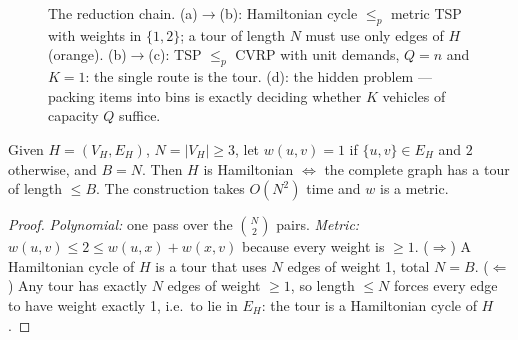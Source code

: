 \begin{figure}[t]
\caption{The reduction chain. (a)$\to$(b): Hamiltonian cycle $\le_p$ metric TSP with weights in $\{1,2\}$;
a tour of length $N$ must use only edges of $H$ (orange). (b)$\to$(c): TSP $\le_p$ CVRP with unit
demands, $Q=n$ and $K=1$: the single route is the tour. (d): the hidden problem --- packing items into
bins is exactly deciding whether $K$ vehicles of capacity $Q$ suffice.}
\label{fig:reductions}
\end{figure}

\begin{theorem}[\hc{} $\le_p$ \tsp-D]\label{thm:hc}
Given $H=(V_H,E_H)$, $N=|V_H|\ge 3$, let $w(u,v)=1$ if $\{u,v\}\in E_H$ and $2$ otherwise,
and $B=N$. Then $H$ is Hamiltonian $\iff$ the complete graph has a tour of length $\le B$.
The construction takes $O(N^2)$ time and $w$ is a metric.
\end{theorem}
\begin{proof}
\emph{Polynomial:} one pass over the $\binom N2$ pairs. \emph{Metric:} $w(u,v)\le 2\le w(u,x)+w(x,v)$
because every weight is $\ge1$. ($\Rightarrow$) A Hamiltonian cycle of $H$ is a tour that uses
$N$ edges of weight 1, total $N=B$. ($\Leftarrow$) Any tour has exactly $N$ edges of weight
$\ge1$, so length $\le N$ forces every edge to have weight exactly 1, i.e.\ to lie in $E_H$:
the tour is a Hamiltonian cycle of $H$.
\end{proof}

